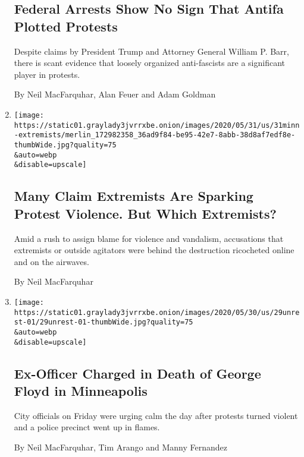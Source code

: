 \begin{enumerate}
  \hypertarget{federal-arrests-show-no-sign-that-antifa-plotted-protests}{%
  \subsection{Federal Arrests Show No Sign That Antifa Plotted
  Protests}\label{federal-arrests-show-no-sign-that-antifa-plotted-protests}}

  Despite claims by President Trump and Attorney General William P.
  Barr, there is scant evidence that loosely organized anti-fascists are
  a significant player in protests.

  By Neil MacFarquhar, Alan Feuer and Adam Goldman
\item
  \href{/2020/05/31/us/george-floyd-protests-white-supremacists-antifa.html}{}

  \texttt{[image: https://static01.graylady3jvrrxbe.onion/images/2020/05/31/us/31minn-extremists/merlin\_172982358\_36ad9f84-be95-42e7-8abb-38d8af7edf8e-thumbWide.jpg?quality=75\\\&auto=webp\\\&disable=upscale]}

  \hypertarget{many-claim-extremists-are-sparking-protest-violence-but-which-extremists}{%
  \subsection{Many Claim Extremists Are Sparking Protest Violence. But
  Which
  Extremists?}\label{many-claim-extremists-are-sparking-protest-violence-but-which-extremists}}

  Amid a rush to assign blame for violence and vandalism, accusations
  that extremists or outside agitators were behind the destruction
  ricocheted online and on the airwaves.

  By Neil MacFarquhar
\item
  \href{/2020/05/29/us/minneapolis-police-george-floyd.html}{}

  \texttt{[image: https://static01.graylady3jvrrxbe.onion/images/2020/05/30/us/29unrest-01/29unrest-01-thumbWide.jpg?quality=75\\\&auto=webp\\\&disable=upscale]}

  \hypertarget{ex-officer-charged-in-death-of-george-floyd-in-minneapolis}{%
  \subsection{Ex-Officer Charged in Death of George Floyd in
  Minneapolis}\label{ex-officer-charged-in-death-of-george-floyd-in-minneapolis}}

  City officials on Friday were urging calm the day after protests
  turned violent and a police precinct went up in flames.

  By Neil MacFarquhar, Tim Arango and Manny Fernandez
\end{enumerate}

